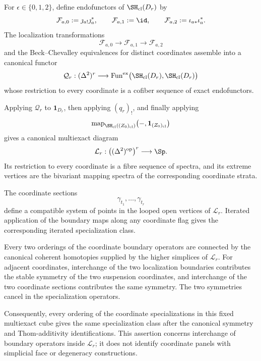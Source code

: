 \begin{proposition}
\begin{enumerate}
    For \(\epsilon\in\{0,1,2\}\), define endofunctors of
    \(\SH_{\mathrm{cl}}(D_r)\) by
    \[
        \mathcal F_{a,0}
        :=
        \jmath_{a!}\jmath_a^*,
        \qquad
        \mathcal F_{a,1}
        :=
        \id,
        \qquad
        \mathcal F_{a,2}
        :=
        \iota_{a*}\iota_a^*.
    \]
    The localization transformations
    \[
        \mathcal F_{a,0}
        \longrightarrow
        \mathcal F_{a,1}
        \longrightarrow
        \mathcal F_{a,2}
    \]
    and the Beck--Chevalley equivalences for distinct coordinates assemble
    into a canonical functor
    \[
        \mathcal Q_r:
        (\Delta^2)^r
        \longrightarrow
        \operatorname{Fun}^{\mathrm{ex}}
        \bigl(
          \SH_{\mathrm{cl}}(D_r),
          \SH_{\mathrm{cl}}(D_r)
        \bigr)
    \]
    whose restriction to every coordinate is a cofiber sequence of exact
    endofunctors.

    Applying \(\mathcal Q_r\) to \(\mathbf1_{D_r}\), then applying
    \((q_r)_!\), and finally applying
    \[
        \operatorname{map}_{\SH_{\mathrm{cl}}((Z_0)_{\mathrm{cl}})}
        \bigl(
          -,
          \mathbf1_{(Z_0)_{\mathrm{cl}}}
        \bigr)
    \]
    gives a canonical multiexact diagram
    \[
        \mathcal L_r:
        \bigl(
          (\Delta^2)^{\mathrm{op}}
        \bigr)^r
        \longrightarrow
        \Sp.
    \]
    Its restriction to every coordinate is a fibre sequence of spectra,
    and its extreme vertices are the bivariant mapping spectra of the
    corresponding coordinate strata.

    The coordinate sections
    \[
        \gamma_{t_1},\ldots,\gamma_{t_r}
    \]
    define a compatible system of points in the looped open vertices of
    \(\mathcal L_r\).  Iterated application of the boundary maps along any
    coordinate flag gives the corresponding iterated specialization class.

    Every two orderings of the coordinate boundary operators are connected
    by the canonical coherent homotopies supplied by the higher simplices of
    \(\mathcal L_r\).  For adjacent coordinates, interchange of the two
    localization boundaries contributes the stable symmetry of the two
    suspension coordinates, and interchange of the two coordinate sections
    contributes the same symmetry.  The two symmetries cancel in the
    specialization operators.

    Consequently, every ordering of the coordinate specializations in this
    fixed multiexact cube gives the same specialization class after the
    canonical symmetry and Thom-additivity identifications.  This assertion
    concerns interchange of boundary operators inside \(\mathcal L_r\); it
    does not identify coordinate panels with simplicial face or degeneracy
    constructions.
\end{enumerate}
\end{proposition}

